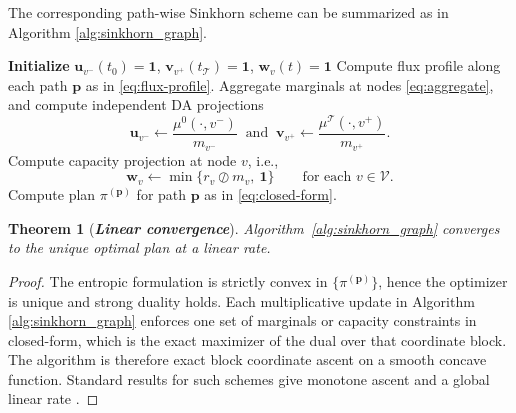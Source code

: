 \documentclass[11pt]{article}
\newcommand{\calV}{{\mathcal V}}
\newcommand{\bp}{{\mathbf p}}
\newcommand{\bu}{{\mathbf u}}
\newcommand{\bv}{{\mathbf v}}
\newcommand{\bw}{{\mathbf w}}
\newtheorem{theorem}{Theorem}
\begin{document}
The corresponding path-wise Sinkhorn scheme can be summarized as in Algorithm \ref{alg:sinkhorn_graph}.
\begin{algorithm}[htb!]
\caption{Path-wise Sinkhorn with nodal capacities}\label{alg:sinkhorn_graph}
\begin{algorithmic}[1]
\STATE \textbf{Initialize} $\bu_{v^-}(t_0)\!=\!\mathbf 1$, $\bv_{v^+}(t_{\mathcal T})\!=\!\mathbf 1$, $\bw_v(t)\!=\!\mathbf 1$
\STATE Compute flux profile along each path $\bp$ as in \eqref{eq:flux-profile}.
\STATE Aggregate marginals at nodes \eqref{eq:aggregate}, and compute independent DA projections
{\setlength{\abovedisplayskip}{5pt}%
 \setlength{\belowdisplayskip}{5pt}%
$$
\bu_{v^-} \leftarrow \frac{\mu^0(\cdot,v^-)}{m_{v^-}} 
\ \mbox{ and } \ 
\bv_{v^+} \leftarrow \frac{\mu^{\mathcal T}(\cdot,v^+)}{m_{v^+}}.
$$}
\STATE Compute capacity projection at node $v$, i.e.,
{\setlength{\abovedisplayskip}{5pt}%
 \setlength{\belowdisplayskip}{5pt}%
$$
\bw_v \leftarrow \min\!\Big\{r_v \oslash m_v, \ \mathbf 1 \Big\}\qquad \text{for each } v \in \calV.
$$}
\ENDWHILE
\STATE Compute plan $\pi^{(\bp)}$ for path $\bp$ as in \eqref{eq:closed-form}.

\end{algorithmic}
\end{algorithm}


\begin{theorem}[\bf \textit{Linear convergence}]\label{thm:convergence}
Algorithm~\ref{alg:sinkhorn_graph} converges to the unique optimal plan at a linear rate. 
\end{theorem}

\begin{proof}
The entropic formulation is strictly convex in $\{\pi^{(\bp)}\}$, hence the optimizer is unique and strong duality holds. Each multiplicative update in Algorithm \ref{alg:sinkhorn_graph} enforces one set of marginals or capacity constraints in closed-form, which is the exact maximizer of the dual over that coordinate block. The algorithm is therefore exact block coordinate ascent \cite{luo1992convergence} on a smooth concave function. Standard results for such schemes give monotone ascent and a global linear rate \cite[Theorem 2.1]{luo1992convergence}.
\end{proof}
\end{document}
